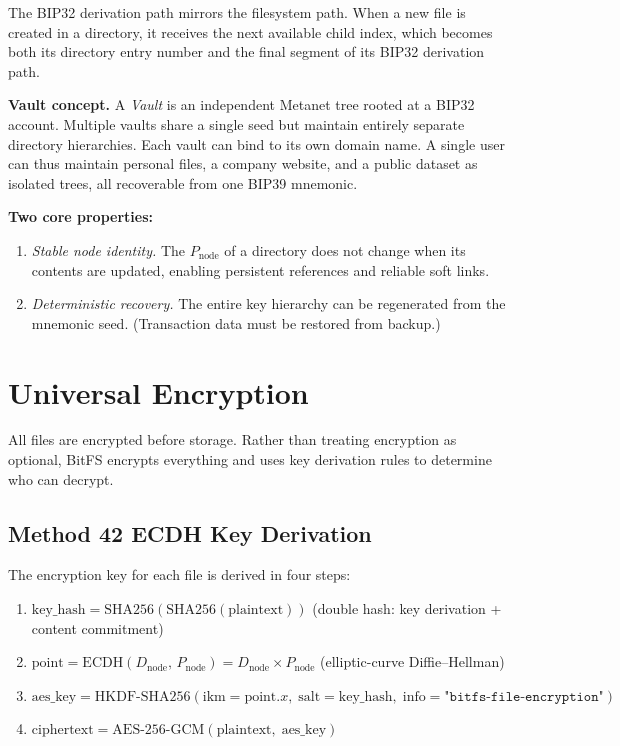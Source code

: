 \documentclass[11pt,a4paper]{article}
\begin{document}
The BIP32 derivation path mirrors the filesystem path. When a new file is created in a directory, it receives the next available child index, which becomes both its directory entry number and the final segment of its BIP32 derivation path.

\textbf{Vault concept.} A \emph{Vault} is an independent Metanet tree rooted at a BIP32 account. Multiple vaults share a single seed but maintain entirely separate directory hierarchies. Each vault can bind to its own domain name. A single user can thus maintain personal files, a company website, and a public dataset as isolated trees, all recoverable from one BIP39 mnemonic.

\textbf{Two core properties:}
\begin{enumerate}
\item \emph{Stable node identity.} The $P_{\text{node}}$ of a directory does not change when its contents are updated, enabling persistent references and reliable soft links.
\item \emph{Deterministic recovery.} The entire key hierarchy can be regenerated from the mnemonic seed. (Transaction data must be restored from backup.)
\end{enumerate}

\section{Universal Encryption}

All files are encrypted before storage. Rather than treating encryption as optional, BitFS encrypts everything and uses key derivation rules to determine who can decrypt.

\subsection{Method 42 ECDH Key Derivation}

The encryption key for each file is derived in four steps:

\begin{enumerate}
\item $\text{key\_hash} = \text{SHA256}(\text{SHA256}(\text{plaintext}))$ \hfill (double hash: key derivation + content commitment)
\item $\text{point} = \text{ECDH}(D_{\text{node}},\, P_{\text{node}}) = D_{\text{node}} \times P_{\text{node}}$ \hfill (elliptic-curve Diffie--Hellman)
\item $\text{aes\_key} = \text{HKDF-SHA256}(\text{ikm}=\text{point}.x,\; \text{salt}=\text{key\_hash},\; \text{info}=\texttt{"bitfs-file-encryption"})$
\item $\text{ciphertext} = \text{AES-256-GCM}(\text{plaintext},\; \text{aes\_key})$
\end{enumerate}
\end{document}
